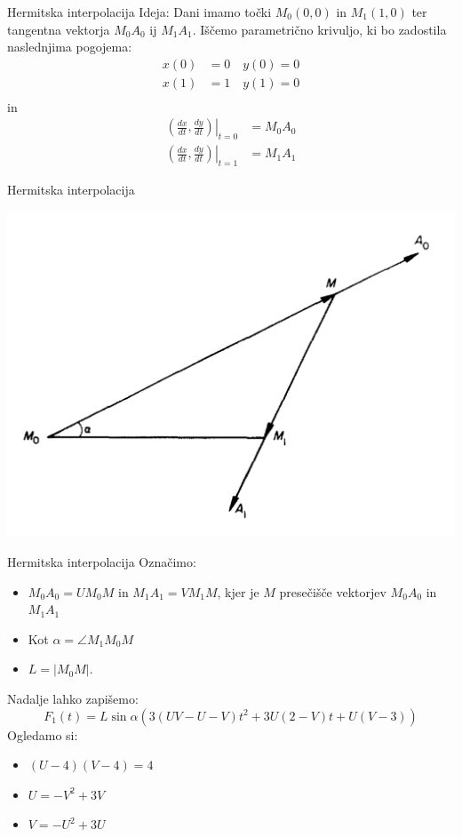 \documentclass{beamer} %
\begin{document}
\begin{frame}{Hermitska interpolacija}
	Ideja: Dani imamo točki $M_0 (0,0)$ in $M_1 (1,0)$ ter tangentna vektorja $M_0A_0$ ij $M_1A_1$. Iščemo parametrično krivuljo, ki bo zadostila naslednjima pogojema:
	\begin{align*}
		x(0) &= 0 \quad y(0) = 0 \\
		x(1) &= 1 \quad y(1) = 0 \\
	\end{align*}
in
	\begin{align*}
		 \left. \left(\frac{dx}{dt},\frac{dy}{dt}\right)\right|_{t=0} &= M_0A_0 \\
		\left.\left(\frac{dx}{dt},\frac{dy}{dt}\right)\right|_{t=1} &= M_1A_1
	\end{align*}
	 
\end{frame}

\begin{frame}{Hermitska interpolacija}
	\begin{center}
	\includegraphics[width=0.6\columnwidth]{hermit.jpg}
	\end{center}
\end{frame}

\begin{frame}{Hermitska interpolacija}
	Označimo:
	\begin{itemize}
		\item $ M_0A_0=UM_0M$ in  $M_1A_1 = VM_1M$,
		kjer je $M$ presečišče vektorjev $M_0A_0$ in $M_1A_1$
		\item Kot $\alpha =  \angle M_1M_0M$
		\item $L = |M_0M|$.
	\end{itemize}
	Nadalje lahko zapišemo:
	\[ F_1(t) =L\sin\alpha(3(UV-U-V)t^2 +3U(2-V)t+ U(V-3)) \]
	Ogledamo si:
	\begin{itemize}
		\item $(U-4)(V-4)=4$
		\item $U = -V^2 +3V$
		\item $V = -U^2 + 3U$
	\end{itemize}
	
\end{frame}
\end{document}
